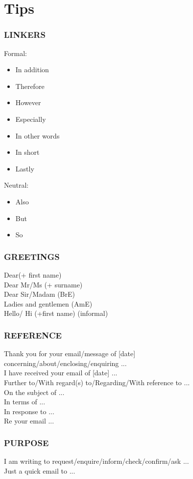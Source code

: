 \section{Tips}
\subsubsection{LINKERS}
Formal:
\begin{itemize}
\item In addition
\item Therefore
\item However
\item Especially
\item In other words
\item In short
\item Lastly
\end{itemize}
Neutral:
\begin{itemize}
\item Also
\item But
\item So
\end{itemize}
\subsubsection{GREETINGS}
Dear(+ first name)\\
Dear Mr/Ms (+ surname)\\
Dear Sir/Madam (BrE)\\
Ladies and gentlemen (AmE)\\
Hello/ Hi (+first name) (informal)\\
\subsubsection{REFERENCE}
Thank you for your email/message of [date] concerning/about/enclosing/enquiring ...\\
I have received your email of [date] ...\\
Further to/With regard(s) to/Regarding/With reference to ...\\
On the subject of ...\\
In terms of ...\\
In response to ...\\
Re your email ...\\
\subsubsection{PURPOSE}
I am writing to request/enquire/inform/check/confirm/ask ...\\
Just a quick email to ...\\
